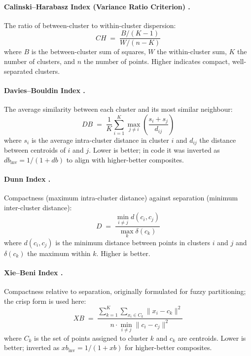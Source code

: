 \paragraph{Calinski--Harabasz Index (Variance Ratio Criterion) \cite{ref18}.} The ratio of between-cluster to within-cluster dispersion:
\begin{equation}\label{eq:calinski_harabasz}
CH \;=\; \frac{B/(K-1)}{W/(n-K)}
\end{equation}
where $B$ is the between-cluster sum of squares, $W$ the within-cluster sum, $K$ the number of clusters, and $n$ the number of points. Higher indicates compact, well-separated clusters.

\paragraph{Davies--Bouldin Index \cite{ref19}.} The average similarity between each cluster and its most similar neighbour:
\begin{equation}\label{eq:davies_bouldin}
DB \;=\; \frac{1}{K} \sum_{i=1}^{K} \max_{j \neq i} \left( \frac{s_i + s_j}{d_{ij}} \right)
\end{equation}
where $s_i$ is the average intra-cluster distance in cluster $i$ and $d_{ij}$ the distance between centroids of $i$ and $j$. Lower is better; in code it was inverted as $db_{\mathrm{inv}} = 1/(1 + db)$ to align with higher-better composites.

\paragraph{Dunn Index \cite{ref20}.} Compactness (maximum intra-cluster distance) against separation (minimum inter-cluster distance):
\begin{equation}\label{eq:dunn}
D \;=\; \frac{\min_{i \neq j} d(c_i, c_j)}{\max_{k} \delta(c_k)}
\end{equation}
where $d(c_i, c_j)$ is the minimum distance between points in clusters $i$ and $j$ and $\delta(c_k)$ the maximum within $k$. Higher is better.

\paragraph{Xie--Beni Index \cite{ref21}.} Compactness relative to separation, originally formulated for fuzzy partitioning; the crisp form is used here:
\begin{equation}\label{eq:xie_beni}
XB \;=\; \frac{\displaystyle \sum_{k=1}^{K} \sum_{x_i \in C_k} \|x_i - c_k\|^2}{\displaystyle n \cdot \min_{i \neq j} \|c_i - c_j\|^2}
\end{equation}
where $C_k$ is the set of points assigned to cluster $k$ and $c_k$ are centroids. Lower is better; inverted as $xb_{\mathrm{inv}} = 1/(1 + xb)$ for higher-better composites.

